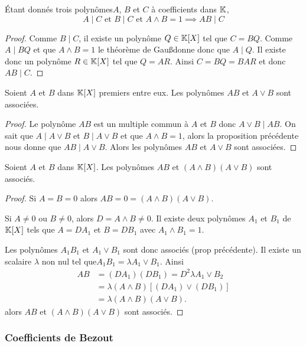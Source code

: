 \begin{prop}
  Étant donnés trois polynômes$ A$, $B$ et $C$ à coefficients dans $\mathbb{K}$,
  \begin{equation}
    A\mid{}C \text{~et~} B\mid{}C \text{~et~} A\wedge B=1 \implies AB\mid{}C
  \end{equation}
\end{prop}
\begin{proof}
  Comme $B\mid{}C$, il existe un polynôme $Q \in \mathbb{K}[X]$ tel que $C=BQ$. Comme $A\mid{}BQ$ et que $A\wedge B=1$ le théorème de Gau\ss donne donc que $A\mid{}Q$. Il existe donc un polynôme $R \in \mathbb{K}[X]$ tel que $Q=AR$. Ainsi $C=BQ=BAR$ et donc $AB\mid{}C$.
\end{proof}

\begin{prop}
  Soient $A$ et $B$ dans $\mathbb{K}[X]$ premiers entre eux. Les polynômes $AB$ et $A \vee B$ sont associées.
\end{prop}
\begin{proof}
  Le polynôme $AB$ est un multiple commun à $A$ et $B$ donc $A\vee B \mid{} AB$. On sait que $A\mid{}A \vee B$ et $B\mid{} A\vee B$ et que $A \wedge B=1$, alors la proposition précédente nous donne que $AB\mid{}A \vee B$. Alors les polynômes $AB$ et $A \vee B$ sont associées.
\end{proof}

\begin{prop}
  Soient $A$ et $B$ dans $\mathbb{K}[X]$. Les polynômes $AB$ et $(A\wedge B)(A \vee B)$ sont associés.
\end{prop}
\begin{proof}
  Si $A=B=0$ alors $AB=0=(A\wedge B)(A \vee B)$.

  Si $A\neq 0$ ou $B\neq 0$, alors $D=A \wedge B \neq 0$. Il existe deux polynômes $A_1$ et $B_1$ de $\mathbb{K}[X]$ tels que $A=DA_1$ et $B=DB_1$ avec $A_1 \wedge B_1 =1$.

  Les polynômes $A_1B_1$ et $A_1 \vee B_1$ sont donc associés (prop précédente). Il existe un scalaire $\lambda$ non nul tel que$ A_1B_1= \lambda A_1 \vee B_1$. Ainsi
  \begin{align}
    AB&=(DA_1)(DB_1) = D^2 \lambda A_1 \vee B_2 \\
    &=\lambda (A \wedge B) [(DA_1) \vee (DB_1)]\\
    &=\lambda (A \wedge B)(A \vee B).
  \end{align}
  alors $AB$ et $(A\wedge B)(A \vee B)$ sont associés.
\end{proof}

\subsubsection{Coefficients de Bezout}

